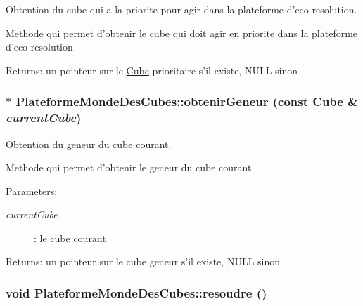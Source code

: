 Obtention du cube qui a la priorite pour agir dans la plateforme d'eco-resolution. 

Methode qui permet d'obtenir le cube qui doit agir en priorite dans la plateforme d'eco-resolution

\begin{Desc}
\item[Returns:]un pointeur sur le \hyperlink{classCube}{Cube} prioritaire s'il existe, NULL sinon \end{Desc}
\hypertarget{classPlateformeMondeDesCubes_23a34346419b046b04f771807a965765}{
\subsubsection[{obtenirGeneur}]{$\ast$ PlateformeMondeDesCubes::obtenirGeneur (const {\bf Cube} \& {\em currentCube})}}
\label{classPlateformeMondeDesCubes_23a34346419b046b04f771807a965765}


Obtention du geneur du cube courant. 

Methode qui permet d'obtenir le geneur du cube courant

\begin{Desc}
\item[Parameters:]
\begin{description}
\item[{\em currentCube}]: le cube courant \end{description}
\end{Desc}
\begin{Desc}
\item[Returns:]un pointeur sur le cube geneur s'il existe, NULL sinon \end{Desc}
\hypertarget{classPlateformeMondeDesCubes_c7be18c8d02e2743e884545828cfabed}{
\subsubsection[{resoudre}]{\setlength{\rightskip}{0pt plus 5cm}void PlateformeMondeDesCubes::resoudre ()}}
\label{classPlateformeMondeDesCubes_c7be18c8d02e2743e884545828cfabed}


